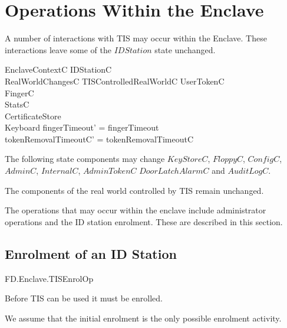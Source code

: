 
\chapter{Operations Within the Enclave}
\label{sec:Enclave}

A number of interactions with TIS may occur within the
Enclave.
These interactions leave some of the $IDStation$ state unchanged.

\begin{schema}{EnclaveContextC}
        \Delta IDStationC
\\      RealWorldChangesC
\also
        \Xi TISControlledRealWorldC
\also
        \Xi UserTokenC
\\      \Xi FingerC
\\      \Xi StatsC
\\      \Xi CertificateStore
\\      \Xi Keyboard
\where
        fingerTimeout' = fingerTimeout
\\      tokenRemovalTimeoutC' = tokenRemovalTimeoutC
\end{schema}
\begin{Zcomment}
\item
The following state components may change $KeyStoreC$, 
$FloppyC$, $ConfigC$, $AdminC$, $InternalC$, $AdminTokenC$
$DoorLatchAlarmC$ and $AuditLogC$. 
\item
The components of the real world controlled by TIS remain unchanged.
\end{Zcomment}

The operations that may occur within the enclave include
administrator operations and the ID station enrolment. These are
described in this section.

\section{Enrolment of an ID Station}

\begin{traceunit}{FD.Enclave.TISEnrolOp}
\end{traceunit}

Before TIS can be used it must be enrolled.

We assume
that the initial enrolment is the only possible enrolment activity.

